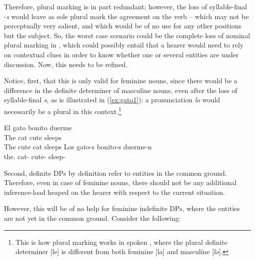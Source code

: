 \documentclass[output=paper,hidelinks]{langscibook}
\begin{document}
Therefore, plural marking is in part redundant; however, the loss of syllable-final -\emph{s} would leave as sole plural mark the agreement on the verb -- which may not be perceptually very salient, and which would be of no use for any other positions but the subject. So, the worst case scenario could be the complete loss of nominal plural marking in , which could possibly entail that a hearer would need to rely on contextual clues in order to know whether one or several entities are under discussion. Now, this needs to be refined.

Notice, first, that this is only valid for feminine nouns, since there would be a difference in the definite determiner of masculine nouns, even after the loss of syllable-final \emph{s}, as is illustrated in (\ref{ex:gato1}): a pronunciation \emph{lo} would necessarily be a plural in this context.\footnote{This is how plural marking works in spoken , where the plural definite determiner [le] is different from both feminine [la] and masculine [lə].}

\begin{exe}
  \ex \label{ex:gato1}
  \begin{xlist}
    \ex 
    \gll El gato bonito duerme\\
    The cat cute sleeps\\
    \glt The cute cat sleeps
    \ex
    \gll Los gato-s bonito-s duerme-n\\
    the.\PL{} cat-\PL{} cute-\PL{} sleep-\PL{}\\
  \end{xlist}
\end{exe}

Second, definite DPs by definition refer to entities in the common ground. Therefore, even in case of feminine nouns, there should not be any additional inference-load heaped on the hearer with respect to the current situation.

However, this will be of no help for feminine indefinite DPs, where the entities are not yet in the common ground. Consider the following:

\begin{exe}
  \ex
  \begin{xlist}
  \end{xlist}
\end{exe}
\end{document}
